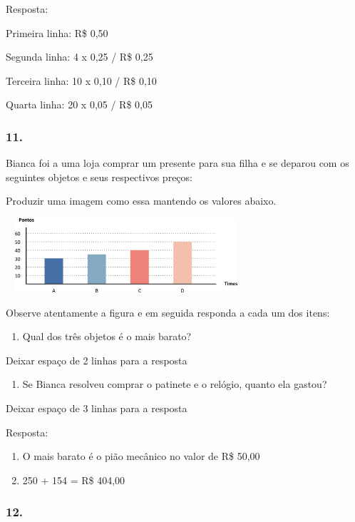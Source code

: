Resposta:

Primeira linha: R\$ 0,50

Segunda linha: 4 x 0,25 / R\$ 0,25

Terceira linha: 10 x 0,10 / R\$ 0,10

Quarta linha: 20 x 0,05 / R\$ 0,05

\subsubsection{11.}\label{section-90}

Bianca foi a uma loja comprar um presente para sua filha e se deparou
com os seguintes objetos e seus respectivos preços:

Produzir uma imagem como essa mantendo os valores abaixo.

\includegraphics[width=3.51697in,height=1.08343in]{media/image80.png}

Observe atentamente a figura e em seguida responda a cada um dos itens:

\begin{enumerate}
\def\labelenumi{\alph{enumi})}
\item
  Qual dos três objetos é o mais barato?
\end{enumerate}

Deixar espaço de 2 linhas para a resposta

\begin{enumerate}
\def\labelenumi{\alph{enumi})}
\item
  Se Bianca resolveu comprar o patinete e o relógio, quanto ela gastou?
\end{enumerate}

Deixar espaço de 3 linhas para a resposta

Resposta:

\begin{enumerate}
\def\labelenumi{\alph{enumi})}
\item
  O mais barato é o pião mecânico no valor de R\$ 50,00
\item
  250 + 154 = R\$ 404,00
\end{enumerate}

\subsubsection{12.}\label{section-91}

